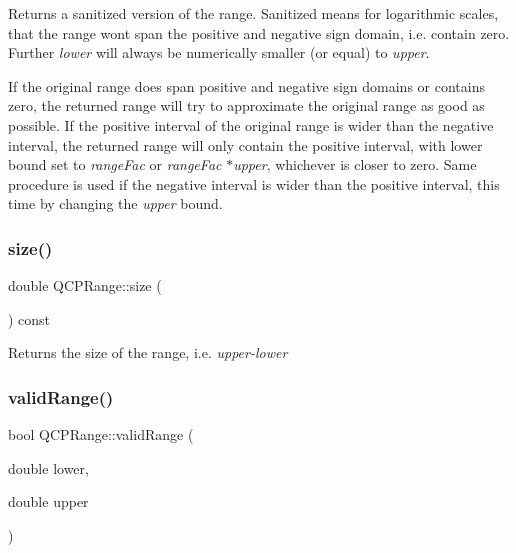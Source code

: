 Returns a sanitized version of the range. Sanitized means for logarithmic scales, that the range won\textquotesingle{}t span the positive and negative sign domain, i.\+e. contain zero. Further {\itshape lower} will always be numerically smaller (or equal) to {\itshape upper}.

If the original range does span positive and negative sign domains or contains zero, the returned range will try to approximate the original range as good as possible. If the positive interval of the original range is wider than the negative interval, the returned range will only contain the positive interval, with lower bound set to {\itshape range\+Fac} or {\itshape range\+Fac} $\ast${\itshape upper}, whichever is closer to zero. Same procedure is used if the negative interval is wider than the positive interval, this time by changing the {\itshape upper} bound. \mbox{\label{class_q_c_p_range_a62326e7cc4316b96df6a60813230e63f}} 
\subsubsection{\texorpdfstring{size()}{size()}}
{\footnotesize\ttfamily double Q\+C\+P\+Range\+::size (\begin{DoxyParamCaption}{ }\end{DoxyParamCaption}) const}

Returns the size of the range, i.\+e. {\itshape upper-\/{\itshape lower} } \mbox{\label{class_q_c_p_range_ab38bd4841c77c7bb86c9eea0f142dcc0}} 
\subsubsection{\texorpdfstring{valid\+Range()}{validRange()}\hspace{0.1cm}{\footnotesize\ttfamily [1/2]}}
{\footnotesize\ttfamily bool Q\+C\+P\+Range\+::valid\+Range (\begin{DoxyParamCaption}\item[{double}]{lower,  }\item[{double}]{upper }\end{DoxyParamCaption})\hspace{0.3cm}{\ttfamily [static]}}


